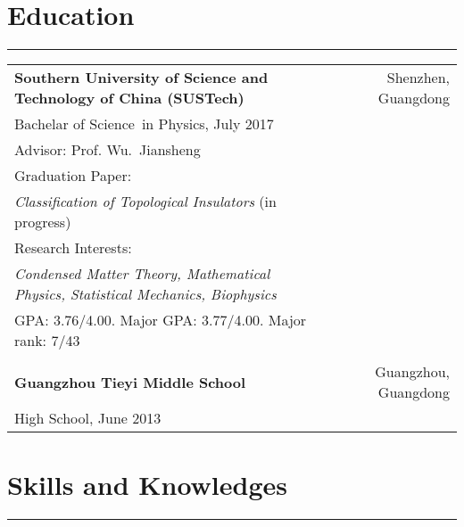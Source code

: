 \documentclass[letterpaper]{article}
\begin{document}
\section*{Education}
\vspace{-8pt}
\hrule height .7pt
\smallskip
\begin{tabular*}{\textwidth}{l@{\extracolsep{\fill}}r}
{\bf\large Southern University of Science and Technology of China
    (SUSTech)} & Shenzhen, Guangdong\\
Bachelar of Science~in Physics, July 2017 \\
Advisor: Prof. Wu.~Jiansheng \\
Graduation Paper: \\
{\textit{Classification of Topological Insulators }(in
progress)}\\ 
Research Interests: \\
{\textit{Condensed Matter Theory, Mathematical Physics, Statistical
Mechanics, Biophysics}}\\
GPA: 3.76/4.00. Major GPA: 3.77/4.00. Major rank: 7/43  \\

\\

{\bf\large Guangzhou Tieyi Middle School} & Guangzhou, Guangdong \\
High School, June 2013 \\

\end{tabular*}

\section*{Skills and Knowledges}
\vspace{-8pt}
\hrule height .7pt
$ $
\end{document}
